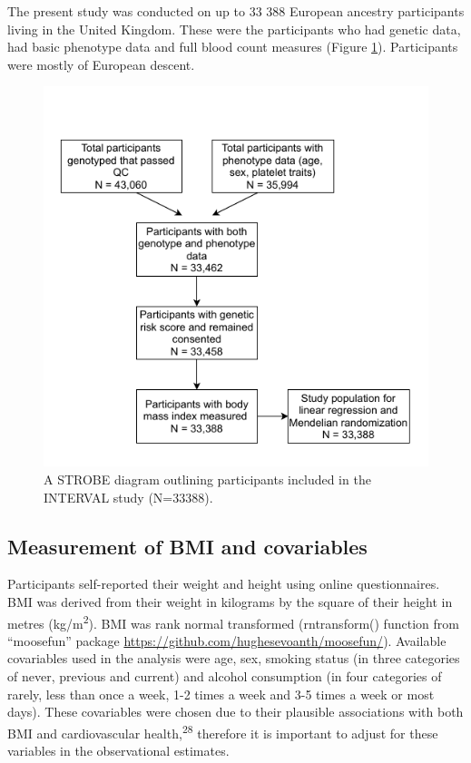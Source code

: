 \documentclass[11pt,twoside]{bristolthesis}
\begin{document}
The present study was conducted on up to 33 388 European ancestry participants living in the United Kingdom. These were the participants who had genetic data, had basic phenotype data and full blood count measures (Figure \ref{fig:INTERVAL-STROBE}). Participants were mostly of European descent.
\begin{figure}
\includegraphics[width=0.8\linewidth]{figure/BMI_platelets/STROBE_diagram} \caption{A STROBE diagram outlining participants included in the INTERVAL study (N=33388).}\label{fig:INTERVAL-STROBE}
\end{figure}
\hypertarget{measurement-of-bmi-and-covariables}{%
\subsection{Measurement of BMI and covariables}\label{measurement-of-bmi-and-covariables}}

Participants self-reported their weight and height using online questionnaires. BMI was derived from their weight in kilograms by the square of their height in metres (kg/m\textsuperscript{2}). BMI was rank normal transformed (rntransform() function from ``moosefun'' package \url{https://github.com/hughesevoanth/moosefun/}). Available covariables used in the analysis were age, sex, smoking status (in three categories of never, previous and current) and alcohol consumption (in four categories of rarely, less than once a week, 1-2 times a week and 3-5 times a week or most days). These covariables were chosen due to their plausible associations with both BMI and cardiovascular health,\textsuperscript{28} therefore it is important to adjust for these variables in the observational estimates.
\end{document}
